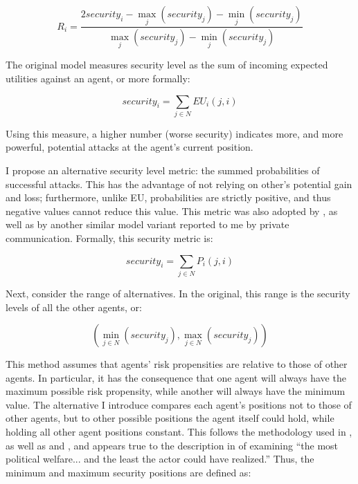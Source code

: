 \begin{equation}
    R_i = \frac{ 2 security_i - \max\limits_j (security_j)  -  \min\limits_j (security_j)}{\max\limits_j (security_j)  -  \min\limits_j (security_j)}
\end{equation}

The original model measures security level as the sum of incoming expected utilities against an agent, or more formally:


\begin{equation}
    security_i = \sum_{j \in N} EU_i(j, i)
\end{equation}

Using this measure, a higher number (worse security) indicates more, and more powerful, potential attacks at the agent's current position.

I propose an alternative security level metric: the summed probabilities of successful attacks. This has the advantage of not relying on other's potential gain and loss; furthermore, unlike EU, probabilities are strictly positive, and thus negative values cannot reduce this value.  This metric was also adopted by \citet{wise_2015a}, as well as by another similar model variant reported to me by private communication. Formally, this security metric is:

\begin{equation}
    security_i = \sum\limits_{j \in N} P_i(j, i) \label{eq:r1_security}
\end{equation}

Next, consider the range of alternatives. In the original, this range is the security levels of all the other agents, or:

\begin{equation}
    (\min\limits_{j \in N} (security_j), \max\limits_{j \in N} (security_j))
\end{equation}

This method assumes that agents' risk propensities are relative to those of other agents. In particular, it has the consequence that one agent will always have the maximum possible risk propensity, while another will always have the minimum value. The alternative I introduce compares each agent's positions not to those of other agents, but to other possible positions the agent itself could hold, while holding all other agent positions constant. This follows the methodology used in \citet{bdm_1985}, as well as \citet{bdm_1992} and \citet{bennett_2000b}, and appears true to the description in \citet{bdm_2002} of examining ``the most political welfare... and the least the actor could have realized.'' Thus, the minimum and maximum security positions are defined as:

